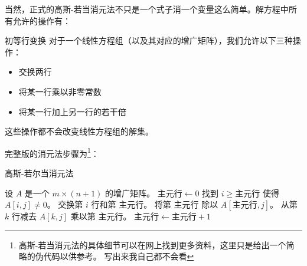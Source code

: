 \documentclass{ctexart}
\begin{document}
当然，正式的高斯-若当消元法不只是一个式子消一个变量这么简单。解方程中所有允许的操作有：
\begin{definition}{初等行变换}
    对于一个线性方程组（以及其对应的增广矩阵），我们允许以下三种操作：
    \begin{itemize}
        \item 交换两行
        \item 将某一行乘以非零常数
        \item 将某一行加上另一行的若干倍
    \end{itemize}
\end{definition}

这些操作都不会改变线性方程组的解集。

完整版的消元法步骤为\footnote{高斯-若当消元法的具体细节可以在网上找到更多资料，这里只是给出一个简略的伪代码以供参考。
写出来我自己都不会看}：

\begin{algorithm}[H]
    \caption{高斯-若尔当消元法}
    \label{alg:gauss-jordan}
    \begin{algorithmic}[1]
        \State 设 \(A\) 是一个 \(m \times (n+1)\) 的增广矩阵。
        \State \( \text{主元行} \leftarrow 0 \)
          
        \State 找到 \(i \ge \text{主元行}\) 使得 \(A[i, j] \ne 0\)。
        \State 交换第 \(i\) 行和第 \(\text{主元行}\)。
        \State 将第 \(\text{主元行}\) 除以
        \(A[\text{主元行}, j]\)。 
         
        \State 从第 \(k\) 行减去 \(A[k, j]\) 乘以第 \(\text{主元行}\)。
        \EndIf
        \EndFor
        \State \( \text{主元行} \leftarrow \text{主元行} + 1 \)
        \EndIf
        \EndFor
    \end{algorithmic}
\end{algorithm}
\end{document}
